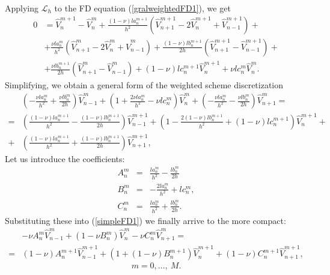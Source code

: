 Applying $\mathcal{L}_h$ to the FD equation (\ref{gralweightedFD1}),
we get 
\begin{equation}
\begin{split}
0 & = \widehat{V}^{m+1}_n-\widehat{V}^m_n + \frac{(1-\nu) l
  a^{m+1}_n}{h^2}(\widehat{V}^{m+1}_{n+1}-2\widehat{V}^{m+1}_n+\widehat{V}^{m+1}_{n-1})+\\  
  & +\frac{\nu l a^m_n}{h^2}(\widehat{V}^m_{n+1}-2
  \widehat{V}^m_n+\widehat{V}^{m}_{n-1})+ 
  \frac{(1-\nu) l
    b^{m+1}_n}{2h}(\widehat{V}^{m+1}_{n+1}-\widehat{V}^{m+1}_{n-1}) +
  \\ 
& +\frac{\nu l b^{m+1}_n}{2h}(\widehat{V}^m_{n+1}-\widehat{V}^m_{n-1}) + (1-\nu) l
c^{m+1}_n \widehat{V}^{m+1}_n + \nu l c^m_n \widehat{V}^m_n. 
\end{split}
\end{equation}
Simplifying, we obtain a general form of the weighted scheme
discretization 
\begin{equation}
\label{simpleFD1}
\begin{split}
& \left(-\frac{\nu l a^m_n}{h^2}+\frac{\nu l b^m_n}{2h} \right)
\widehat{V}^m_{n-1}+  
\left( 1+\frac{2\nu l a^m_n}{h^2} - \nu l c^m_n \right) \widehat{V}^m_n +\left(-\frac{\nu l
    a^m_n}{h^2}-\frac{\nu l b^m_n}{2h} \right) \widehat{V}^m_{n+1} = \\
= & \left( \frac{(1-\nu) l a^{m+1}_n}{h^2} - \frac{(1-\nu) l b^{m+1}_n}{2
    h} \right)\widehat{V}^{m+1}_{n-1}+ \left( 1- \frac{2(1- \nu)l
    b^{m+1}_n}{h^2} +(1-\nu) l c^{m+1}_n \right) \widehat{V}^{m+1}_n +\\
+ & \left( \frac{(1-\nu) l a^{m+1}_n}{h^2} + \frac{(1-\nu) l b^{m+1}_n}{2h}
\right) \widehat{V}^{m+1}_{n+1},
\end{split}
\end{equation}
Let us introduce the coefficients:
\begin{eqnarray}
\label{gralFDcoef}
\nonumber 
A^m_n & = & \frac{l a^m_n}{h^2} - \frac{l b^m_n}{2h }\\
B^m_n & = & -\frac{2 l a^m_n}{h^2} + l c^m_n, \\
\nonumber 
C^m_n & = & \frac{l a^m_n}{h^2} + \frac{l b^m_n}{2 h}.
\end{eqnarray}
Substituting these into (\ref{simpleFD1}) we finally arrive to the more
compact:
\begin{equation}
\label{simpleFD2}
\begin{split}
& -\nu A^m_n \widehat{V}^m_{n-1}+ \left(1-\nu B^m_n \right)
\widehat{V}^m_n - \nu C^m_n \widehat{V}^m_{n+1} = \\
= & (1-\nu) A^{m+1}_n \widehat{V}^{m+1}_{n-1} + \left( 1+ (1-\nu)
B^{m+1}_n \right) \widehat{V}^{m+1}_n + (1-\nu ) C^{m+1}_n \widehat{V}^{m+1}_{n+1},
\end{split}
\end{equation}
$$
m = 0, \dots,~M.
$$

